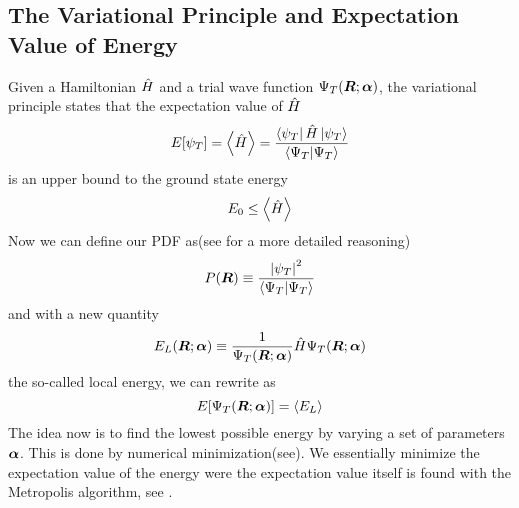     \subsection{The Variational Principle and Expectation Value of Energy}
        Given a Hamiltonian $\hat{H}$ and a trial wave function ${\Psi}_T(\boldsymbol{{R}};\boldsymbol{{\alpha}})$, the
        variational principle \cite{GriffQuan, NeOr} states that the
        expectation value of $\hat{H}$
            \begin{equation}
                E[\psi_T] = \left< {\hat{H}} \right> =
                \frac{\bra{\psi_T}\hat{H}\ket{\psi_T}}{\bra{\Psi_T}\ket{\Psi_T}}
                \label{eq:ecpE}
            \end{equation}
        is an upper bound to the ground state energy
            \begin{equation}
                E_0 \leq \left< {\hat{H}} \right>
                \label{eq:ecpEBound}
            \end{equation}
        Now we can define our PDF as(see  for a more
        detailed reasoning)
            \begin{equation}
                P(\boldsymbol{{R}}) \equiv \frac{\abs{\psi_T}^2}{\bra{\Psi_T}\ket{\Psi_T}}
                \label{eq:PDFdef}
            \end{equation}
        and with a new quantity
            \begin{equation}
                E_L(\boldsymbol{{R}};\boldsymbol{{\alpha}}) \equiv \frac{1}{{\Psi}_T(\boldsymbol{{R}};\boldsymbol{{\alpha}})}\hat{H}{\Psi}_T(\boldsymbol{{R}};\boldsymbol{{\alpha}})
                \label{eq:ELdef}
            \end{equation}
        the so-called local energy, we can rewrite  as
            \begin{equation}
                E[{\Psi}_T(\boldsymbol{{R}};\boldsymbol{{\alpha}})] = \left< {E_L} \right>
            \end{equation}
        The idea now is to find the lowest possible energy by varying a set of
        parameters $\boldsymbol{{\alpha}}$. This is done by numerical
        minimization(see). We essentially minimize the
        expectation value of the energy were the expectation value itself is
        found with the Metropolis algorithm, see .

